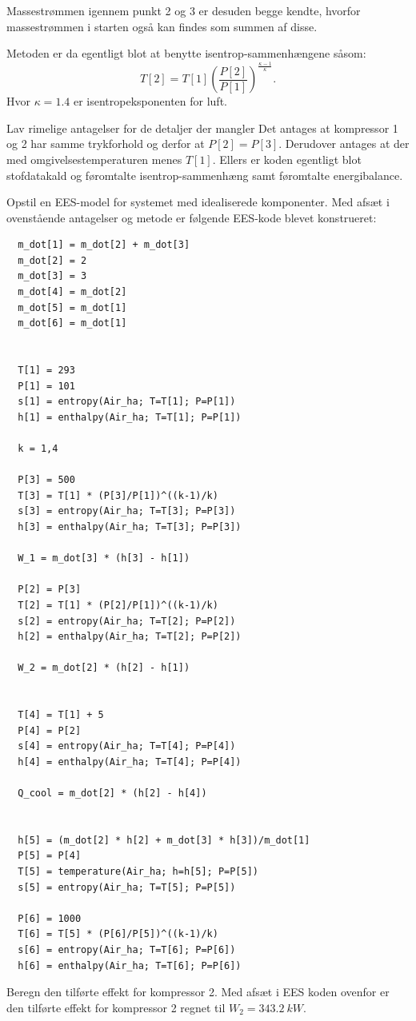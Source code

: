 \documentclass[a4paper]{article}
\begin{document}
Massestrømmen igennem punkt 2 og 3 er desuden begge kendte, hvorfor massestrømmen i starten også kan findes som summen af disse.

Metoden er da egentligt blot at benytte isentrop-sammenhængene såsom:
\[ 
  T[2] = T[1] \left( \frac{P[2]}{P[1]} \right)^{\frac{\kappa - 1}{\kappa}}
.\]
Hvor $\kappa = \num{1,4}$ er isentropeksponenten for luft.

 Lav rimelige antagelser for de detaljer der mangler
\bigbreak
Det antages at kompressor 1 og 2 har samme trykforhold og derfor at $P[2] = P[3]$. Derudover antages at der med omgivelsestemperaturen menes $T[1]$. Ellers er koden egentligt blot stofdatakald og føromtalte isentrop-sammenhæng samt føromtalte energibalance.

 Opstil en EES-model for systemet med idealiserede komponenter.
\bigbreak
Med afsæt i ovenstående antagelser og metode er følgende EES-kode blevet konstrueret:
\begin{verbatim}
  m_dot[1] = m_dot[2] + m_dot[3]
  m_dot[2] = 2
  m_dot[3] = 3
  m_dot[4] = m_dot[2]
  m_dot[5] = m_dot[1]
  m_dot[6] = m_dot[1]

   
  T[1] = 293
  P[1] = 101
  s[1] = entropy(Air_ha; T=T[1]; P=P[1])
  h[1] = enthalpy(Air_ha; T=T[1]; P=P[1])
   
  k = 1,4
   
  P[3] = 500
  T[3] = T[1] * (P[3]/P[1])^((k-1)/k)
  s[3] = entropy(Air_ha; T=T[3]; P=P[3])
  h[3] = enthalpy(Air_ha; T=T[3]; P=P[3])
   
  W_1 = m_dot[3] * (h[3] - h[1])
   
  P[2] = P[3]
  T[2] = T[1] * (P[2]/P[1])^((k-1)/k)
  s[2] = entropy(Air_ha; T=T[2]; P=P[2])
  h[2] = enthalpy(Air_ha; T=T[2]; P=P[2])
   
  W_2 = m_dot[2] * (h[2] - h[1])
   
   
  T[4] = T[1] + 5
  P[4] = P[2]
  s[4] = entropy(Air_ha; T=T[4]; P=P[4])
  h[4] = enthalpy(Air_ha; T=T[4]; P=P[4])
   
  Q_cool = m_dot[2] * (h[2] - h[4])
   
   
  h[5] = (m_dot[2] * h[2] + m_dot[3] * h[3])/m_dot[1]
  P[5] = P[4]
  T[5] = temperature(Air_ha; h=h[5]; P=P[5])
  s[5] = entropy(Air_ha; T=T[5]; P=P[5])
   
  P[6] = 1000
  T[6] = T[5] * (P[6]/P[5])^((k-1)/k)
  s[6] = entropy(Air_ha; T=T[6]; P=P[6])
  h[6] = enthalpy(Air_ha; T=T[6]; P=P[6])
\end{verbatim}


 Beregn den tilførte effekt for kompressor 2.
\bigbreak
Med afsæt i EES koden ovenfor er den tilførte effekt for kompressor 2 regnet til $W_2 = \qty{343,2}{kW}$. 
\end{document}
